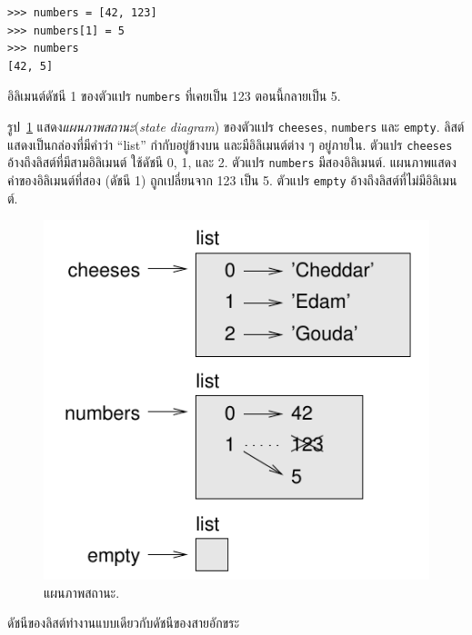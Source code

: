 \begin{verbatim}
>>> numbers = [42, 123]
>>> numbers[1] = 5
>>> numbers
[42, 5]
\end{verbatim}
%
อิลิเมนต์ดัชนี 1 ของตัวแปร \texttt{numbers}
ที่เคยเป็น 123 ตอนนี้กลายเป็น 5.

รูป~\ref{fig.liststate} 
แสดง\textit{แผนภาพสถานะ}(\textit{state diagram})
ของตัวแปร \texttt{cheeses}, 
\texttt{numbers} 
และ \texttt{empty}.
%
ลิสต์แสดงเป็นกล่องที่มีคำว่า ``list'' กำกับอยู่ข้างบน
และมีอิลิเมนต์ต่าง ๆ อยู่ภายใน.
ตัวแปร \texttt{cheeses} อ้างถึงลิสต์ที่มีสามอิลิเมนต์ ใช้ดัชนี 0, 1, และ 2.
ตัวแปร \texttt{numbers} มีสองอิลิเมนต์.
แผนภาพแสดงค่าของอิลิเมนต์ที่สอง (ดัชนี 1) ถูกเปลี่ยนจาก 123 เป็น 5.
ตัวแปร \texttt{empty} อ้างถึงลิสต์ที่ไม่มีอิลิเมนต์.

\begin{figure}
\centerline
{\includegraphics[scale=0.8]{figs/liststate.pdf}}
\caption{แผนภาพสถานะ.}
\label{fig.liststate}
\end{figure}

ดัชนีของลิสต์ทำงานแบบเดียวกับดัชนีของสายอักขระ

